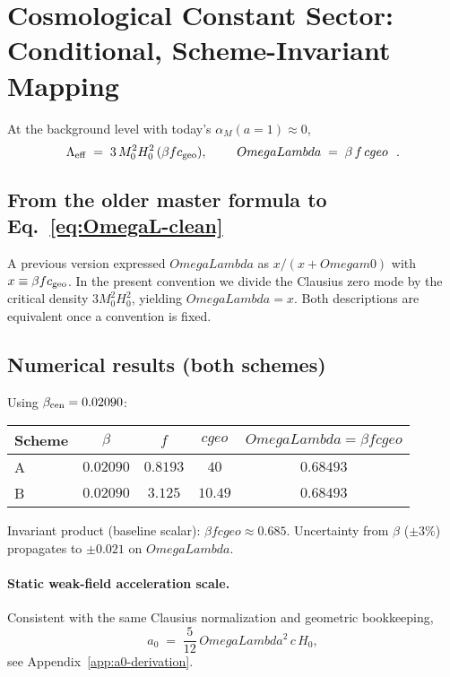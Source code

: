 \documentclass[aps,prd,onecolumn,superscriptaddress,nofootinbib]{revtex4-2}
\def\OmL{OmegaLambda}%
\def\Omm{Omega m0}%
\def\cgeo{cgeo}%
\def\boxed#1{#1}%
\newcommand{\OmL}{\Omega_\Lambda}
\newcommand{\Omm}{\Omega_{m0}}
\newcommand{\cgeo}{c_{\rm geo}}
\begin{document}
\section{Cosmological Constant Sector: Conditional, Scheme-Invariant Mapping}
\label{sec:OmegaL}
At the background level with today’s \(\alpha_M(a{=}1)\approx 0\),
\begin{equation}
\Lambda_{\rm eff} \;=\; 3\,M_0^2 H_0^2\,(\beta f c_{\rm geo}),\qquad
\boxed{\ \OmL \;=\; \beta\, f \, \cgeo\ }\ .
\label{eq:OmegaL-clean}
\end{equation}

\subsection{From the older master formula to Eq.~\eqref{eq:OmegaL-clean}}
A previous version expressed \(\OmL\) as \(x/(x+\Omm)\) with \(x\equiv \beta f c_{\rm geo}\). In the present convention we divide the Clausius zero mode by the critical density \(3M_0^2H_0^2\), yielding \(\OmL=x\). Both descriptions are equivalent once a convention is fixed.

\subsection{Numerical results (both schemes)}
\label{sec:numerics}
Using \(\beta_{\rm cen}=0.02090\):
\begin{center}
\begin{tabular}{l|c|c|c|c}
\hline
Scheme & \(\beta\) & \(f\) & \(\cgeo\) & \(\OmL=\beta f \cgeo\) \\ \hline
A & \(0.02090\) & \(0.8193\) & \(40\) & \(0.68493\) \\
B & \(0.02090\) & \(3.125\) & \(10.49\) & \(0.68493\) \\ \hline
\end{tabular}
\end{center}
Invariant product (baseline scalar): \(\beta f \cgeo \approx 0.685\). Uncertainty from \(\beta\) (\(\pm3\%\)) propagates to \(\pm 0.021\) on \(\OmL\).

\paragraph*{Static weak-field acceleration scale.}
Consistent with the same Clausius normalization and geometric bookkeeping,
\begin{equation}
a_0 \;=\; \frac{5}{12}\,\OmL^2\,c\,H_0,
\end{equation}
see Appendix~\ref{app:a0-derivation}.
\end{document}
